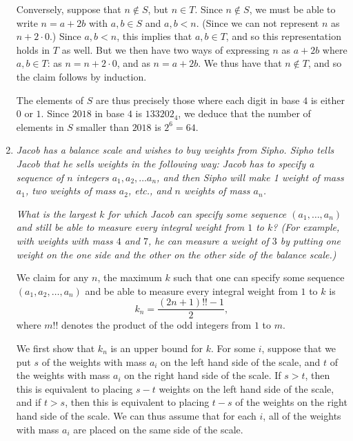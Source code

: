 \documentclass{article}
\begin{document}
\begin{enumerate}[1.]
Conversely, suppose that $n \not\in S$, but $n \in T$. Since $n \not\in S$, we must be able to write $n = a + 2b$ with $a, b \in S$ and $a, b < n$. (Since we can not represent $n$ as $n + 2 \cdot 0$.) Since $a, b < n$, this implies that $a, b \in T$, and so this representation holds in $T$ as well. But we then have two ways of expressing $n$ as $a + 2b$ where $a, b \in T$: as $n = n + 2 \cdot 0$, and as $n = a + 2b$. We thus have that $n \not\in T$, and so the claim follows by induction.

The elements of $S$ are thus precisely those where each digit in base $4$ is either $0$ or $1$. Since $2018$ in base $4$ is ${133202}_{4}$, we deduce that the number of elements in $S$ smaller than $2018$ is $2^6 = 64$.



\vspace{6pt}
\item %
\textit{Jacob has a balance scale and wishes to buy weights from Sipho. Sipho tells Jacob that he sells weights in the following way: Jacob has to specify a sequence of $n$ integers $a_1, a_2, \dotsc a_n$, and then Sipho will make 1 weight of mass $a_1$, two weights of mass $a_2$, etc., and $n$ weights of mass $a_n$.}

\textit{What is the largest $k$ for which Jacob can specify some sequence $(a_1, \dotsc, a_n)$ and still be able to measure every integral weight from $1$ to $k$? (For example, with weights with mass $4$ and $7$, he can measure a weight of $3$ by putting one weight on the one side and the other on the other side of the balance scale.)}


We claim for any $n$, the maximum $k$ such that one can specify some sequence $(a_1, a_2, \dots, a_n)$ and be able to measure every integral weight from $1$ to $k$ is
\[
  k_n = \frac{(2n + 1)!! - 1}{2},
\]
where $m!!$ denotes the product of the odd integers from $1$ to $m$.

We first show that $k_n$ is an upper bound for $k$. For some $i$, suppose that we put $s$ of the weights with mass $a_i$ on the left hand side of the scale, and $t$ of the weights with mass $a_i$ on the right hand side of the scale. If $s > t$, then this is equivalent to placing $s - t$ weights on the left hand side of the scale, and if $t > s$, then this is equivalent to placing $t - s$ of the weights on the right hand side of the scale. We can thus assume that for each $i$, all of the weights with mass $a_i$ are placed on the same side of the scale.


\end{enumerate}
\end{document}
